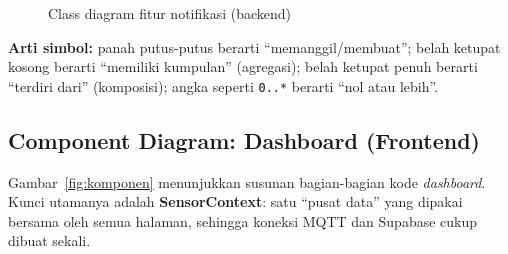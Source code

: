 \documentclass[11pt,a4paper]{article}
\newcommand{\kode}[1]{\texttt{#1}}
\begin{document}
\begin{figure}[H]
\caption{Class diagram fitur notifikasi (backend)}
\label{fig:class-notif}
\end{figure}

\textbf{Arti simbol:} panah putus-putus berarti ``memanggil/membuat'';
belah ketupat kosong berarti ``memiliki kumpulan'' (agregasi);
belah ketupat penuh berarti ``terdiri dari'' (komposisi);
angka seperti \kode{0..*} berarti ``nol atau lebih''.

\subsection{Component Diagram: Dashboard (Frontend)}
Gambar~\ref{fig:komponen} menunjukkan susunan bagian-bagian kode \textit{dashboard}.
Kunci utamanya adalah \textbf{SensorContext}: satu ``pusat data'' yang dipakai bersama oleh semua halaman,
sehingga koneksi MQTT dan Supabase cukup dibuat sekali.
\end{document}
